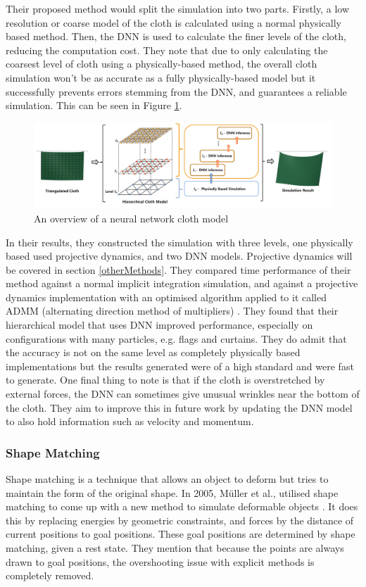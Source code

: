 \documentclass[12pt,a4paper]{article}
\begin{document}
Their proposed method would split the simulation into two parts. Firstly, a low resolution or coarse model of the cloth is calculated using a normal physically based method. Then, the DNN is used to calculate the finer levels of the cloth, reducing the computation cost. They note that due to only calculating the coarsest level of cloth using a physically-based method, the overall cloth simulation won't be as accurate as a fully physically-based model but it successfully prevents errors stemming from the DNN, and guarantees a reliable simulation. This can be seen in Figure \ref{fig:DNN}.
\begin{figure}[h]
	\includegraphics[width=\textwidth]{DNN.png}
	\caption{An overview of a neural network cloth model}
	\label{fig:DNN}
\end{figure}

In their results, they constructed the simulation with three levels, one physically based used projective dynamics, and two DNN models. Projective dynamics will be covered in section \ref{otherMethods}. They compared time performance of their method against a normal implicit integration simulation, and against a projective dynamics implementation with an optimised algorithm applied to it called ADMM (alternating direction method of multipliers) \cite{ADMM}. They found that their hierarchical model that uses DNN improved performance, especially on configurations with many particles, e.g. flags and curtains. They do admit that the accuracy is not on the same level as completely physically based implementations but the results generated were of a high standard and were fast to generate. One final thing to note is that if the cloth is overstretched by external forces, the DNN can sometimes give unusual wrinkles near the bottom of the cloth. They aim to improve this in future work by updating the DNN model to also hold information such as velocity and momentum.


\subsubsection{Shape Matching}
Shape matching is a technique that allows an object to deform but tries to maintain the form of the original shape. In 2005, Müller et al., utilised shape matching to come up with a new method to simulate deformable objects \cite{ogshapematching}. It does this by replacing energies by geometric constraints, and forces by the distance of current positions to goal positions. These goal positions are determined by shape matching, given a rest state. They mention that because the points are always drawn to goal positions, the overshooting issue with explicit methods is completely removed.\\
\end{document}
